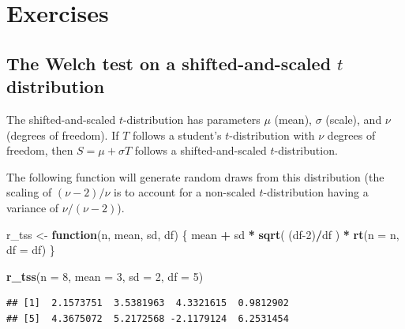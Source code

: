 \documentclass[
]{book}
\newenvironment{Shaded}{\begin{snugshade}}{\end{snugshade}}
\newcommand{\AttributeTok}[1]{\textcolor[rgb]{0.13,0.29,0.53}{#1}}
\newcommand{\ControlFlowTok}[1]{\textcolor[rgb]{0.13,0.29,0.53}{\textbf{#1}}}
\newcommand{\DecValTok}[1]{\textcolor[rgb]{0.00,0.00,0.81}{#1}}
\newcommand{\FunctionTok}[1]{\textcolor[rgb]{0.13,0.29,0.53}{\textbf{#1}}}
\newcommand{\NormalTok}[1]{#1}
\newcommand{\OtherTok}[1]{\textcolor[rgb]{0.56,0.35,0.01}{#1}}
\newcommand{\SpecialCharTok}[1]{\textcolor[rgb]{0.81,0.36,0.00}{\textbf{#1}}}
\begin{document}
\section{Exercises}\label{exercises-3}

\subsection{\texorpdfstring{The Welch test on a shifted-and-scaled \(t\) distribution}{The Welch test on a shifted-and-scaled t distribution}}\label{ex_dgp}

The shifted-and-scaled \(t\)-distribution has parameters \(\mu\) (mean), \(\sigma\) (scale), and \(\nu\) (degrees of freedom).
If \(T\) follows a student's \(t\)-distribution with \(\nu\) degrees of freedom, then \(S = \mu + \sigma T\) follows a shifted-and-scaled \(t\)-distribution.

The following function will generate random draws from this distribution (the scaling of \((\nu-2)/\nu\) is to account for a non-scaled \(t\)-distribution having a variance of \(\nu/(\nu-2)\)).

\begin{Shaded}
\begin{Highlighting}[]
\NormalTok{r\_tss }\OtherTok{\textless{}{-}} \ControlFlowTok{function}\NormalTok{(n, mean, sd, df) \{}
\NormalTok{  mean }\SpecialCharTok{+}\NormalTok{ sd }\SpecialCharTok{*} \FunctionTok{sqrt}\NormalTok{( (df}\DecValTok{{-}2}\NormalTok{)}\SpecialCharTok{/}\NormalTok{df ) }\SpecialCharTok{*} \FunctionTok{rt}\NormalTok{(}\AttributeTok{n =}\NormalTok{ n, }\AttributeTok{df =}\NormalTok{ df)}
\NormalTok{\}}

\FunctionTok{r\_tss}\NormalTok{(}\AttributeTok{n =} \DecValTok{8}\NormalTok{, }\AttributeTok{mean =} \DecValTok{3}\NormalTok{, }\AttributeTok{sd =} \DecValTok{2}\NormalTok{, }\AttributeTok{df =} \DecValTok{5}\NormalTok{)}
\end{Highlighting}
\end{Shaded}

\begin{verbatim}
## [1]  2.1573751  3.5381963  4.3321615  0.9812902
## [5]  4.3675072  5.2172568 -2.1179124  6.2531454
\end{verbatim}
\end{document}
